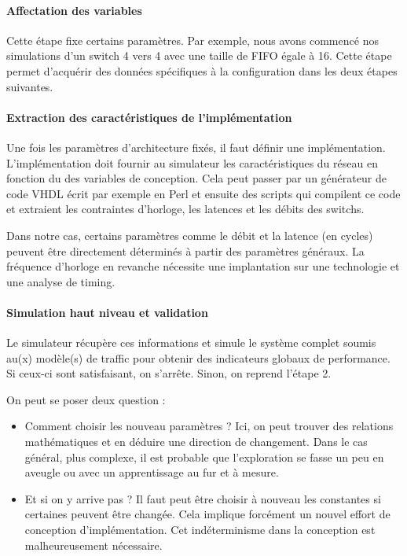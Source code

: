 \documentclass[11pt]{article}
\begin{document}
\paragraph{Affectation des variables}
Cette étape fixe certains paramètres. Par exemple, nous avons commencé nos simulations d'un switch 4 vers 4 avec une taille de FIFO égale à 16. Cette étape permet d'acquérir des données spécifiques à la configuration dans les deux étapes suivantes.

\paragraph{Extraction des caractéristiques de l'implémentation}
Une fois les paramètres d'architecture fixés, il faut définir une implémentation. L'implémentation doit fournir au simulateur les caractéristiques du réseau en fonction du des variables de conception. Cela peut passer par un générateur de code VHDL écrit par exemple en Perl et ensuite des scripts qui compilent ce code et extraient les contraintes d'horloge, les latences et les débits des switchs.

Dans notre cas, certains paramètres comme le débit et la latence (en cycles) peuvent être directement déterminés à partir des paramètres généraux. La fréquence d'horloge en revanche nécessite une implantation sur une technologie et une analyse de timing.

\paragraph{Simulation haut niveau et validation}
Le simulateur récupère ces informations et simule le système complet soumis au(x) modèle(s) de traffic pour obtenir des indicateurs globaux de performance. Si ceux-ci sont satisfaisant, on s'arrête. Sinon, on reprend l'étape 2.

On peut se poser deux question :
\begin{itemize}
\item Comment choisir les nouveau paramètres ? Ici, on peut trouver des relations mathématiques et en déduire une direction de changement. Dans le cas général, plus complexe, il est probable que l'exploration se fasse un peu en aveugle ou avec un apprentissage au fur et à mesure.
\item Et si on y arrive pas ? Il faut peut être choisir à nouveau les constantes si certaines peuvent être changée. Cela implique forcément un nouvel effort de conception d'implémentation. Cet indéterminisme dans la conception est malheureusement nécessaire.
\end{itemize}
\end{document}
